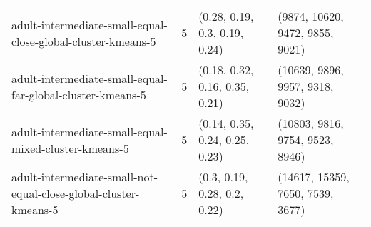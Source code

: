 \begin{longtable}{llll}
                                                 adult-intermediate-small-equal-close-global-cluster-kmeans-5 &              5 &                                                                                                                                                                                                                                                                             (0.28, 0.19, 0.3, 0.19, 0.24) &                                                                                                                                                                                                                                                                           (9874, 10620, 9472, 9855, 9021) \\
                                                   adult-intermediate-small-equal-far-global-cluster-kmeans-5 &              5 &                                                                                                                                                                                                                                                                            (0.18, 0.32, 0.16, 0.35, 0.21) &                                                                                                                                                                                                                                                                           (10639, 9896, 9957, 9318, 9032) \\
                                                        adult-intermediate-small-equal-mixed-cluster-kmeans-5 &              5 &                                                                                                                                                                                                                                                                            (0.14, 0.35, 0.24, 0.25, 0.23) &                                                                                                                                                                                                                                                                           (10803, 9816, 9754, 9523, 8946) \\
                                             adult-intermediate-small-not-equal-close-global-cluster-kmeans-5 &              5 &                                                                                                                                                                                                                                                                              (0.3, 0.19, 0.28, 0.2, 0.22) &                                                                                                                                                                                                                                                                          (14617, 15359, 7650, 7539, 3677) \\

\end{longtable}
